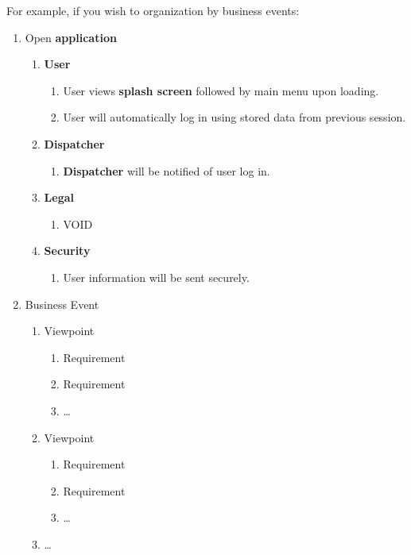 \documentclass[english]{article}
\begin{document}
For example, if you wish to organization by business events:
\begin{enumerate}[{BE}1.]
	\item Open \textbf{application}
	\begin{enumerate}[{VP1}.1]
		\item \textbf{User}
			\begin{enumerate}
				\item User views \textbf{splash screen} followed by main menu upon loading.
				\item User will automatically log in using stored data from previous session.
			\end{enumerate}
		\item \textbf{Dispatcher}
			\begin{enumerate}
				\item \textbf{Dispatcher} will be notified of user log in. 
			\end{enumerate}
		\item \textbf{Legal}
			\begin{enumerate}
			\item VOID
			\end{enumerate}
		\item \textbf{Security}
			\begin{enumerate}
			\item User information will be sent securely.
			\end{enumerate}
	\end{enumerate}
	\item Business Event
	\begin{enumerate}[{VP2}.1]
		\item Viewpoint
			\begin{enumerate}
				\item Requirement
				\item Requirement
				\item \dots
			\end{enumerate}
		\item Viewpoint
			\begin{enumerate}
				\item Requirement
				\item Requirement
				\item \dots
			\end{enumerate}
		\item \dots
	\end{enumerate}
\end{enumerate}
\end{document}
